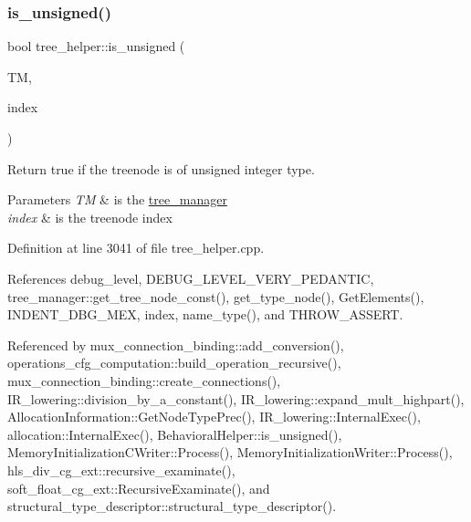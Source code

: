 \subsubsection{\texorpdfstring{is\+\_\+unsigned()}{is\_unsigned()}}
{\footnotesize\ttfamily bool tree\+\_\+helper\+::is\+\_\+unsigned (\begin{DoxyParamCaption}\item[{const \hyperlink{tree__manager_8hpp_a792e3f1f892d7d997a8d8a4a12e39346}{tree\+\_\+manager\+Const\+Ref} \&}]{TM,  }\item[{const unsigned int}]{index }\end{DoxyParamCaption})\hspace{0.3cm}{\ttfamily [static]}}



Return true if the treenode is of unsigned integer type. 


\begin{DoxyParams}{Parameters}
{\em TM} & is the \hyperlink{classtree__manager}{tree\+\_\+manager} \\
\hline
{\em index} & is the treenode index \\
\hline
\end{DoxyParams}


Definition at line 3041 of file tree\+\_\+helper.\+cpp.



References debug\+\_\+level, D\+E\+B\+U\+G\+\_\+\+L\+E\+V\+E\+L\+\_\+\+V\+E\+R\+Y\+\_\+\+P\+E\+D\+A\+N\+T\+IC, tree\+\_\+manager\+::get\+\_\+tree\+\_\+node\+\_\+const(), get\+\_\+type\+\_\+node(), Get\+Elements(), I\+N\+D\+E\+N\+T\+\_\+\+D\+B\+G\+\_\+\+M\+EX, index, name\+\_\+type(), and T\+H\+R\+O\+W\+\_\+\+A\+S\+S\+E\+RT.



Referenced by mux\+\_\+connection\+\_\+binding\+::add\+\_\+conversion(), operations\+\_\+cfg\+\_\+computation\+::build\+\_\+operation\+\_\+recursive(), mux\+\_\+connection\+\_\+binding\+::create\+\_\+connections(), I\+R\+\_\+lowering\+::division\+\_\+by\+\_\+a\+\_\+constant(), I\+R\+\_\+lowering\+::expand\+\_\+mult\+\_\+highpart(), Allocation\+Information\+::\+Get\+Node\+Type\+Prec(), I\+R\+\_\+lowering\+::\+Internal\+Exec(), allocation\+::\+Internal\+Exec(), Behavioral\+Helper\+::is\+\_\+unsigned(), Memory\+Initialization\+C\+Writer\+::\+Process(), Memory\+Initialization\+Writer\+::\+Process(), hls\+\_\+div\+\_\+cg\+\_\+ext\+::recursive\+\_\+examinate(), soft\+\_\+float\+\_\+cg\+\_\+ext\+::\+Recursive\+Examinate(), and structural\+\_\+type\+\_\+descriptor\+::structural\+\_\+type\+\_\+descriptor().

